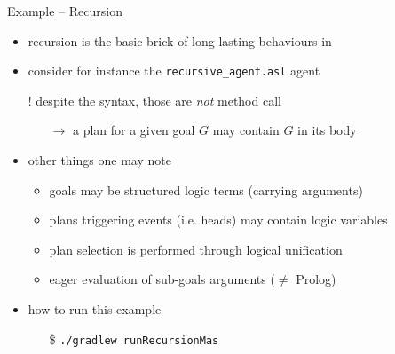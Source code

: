 \documentclass[presentation]{beamer}\mode<presentation>{\usetheme{AMSBolognaFC}}
\begin{document}
\begin{frame}[c, allowframebreaks]{Example \theJasonExample{} -- Recursion}
    \begin{itemize}
        \item recursion is the basic brick of long lasting behaviours in \jason{}
        
        \vspace{.3cm}
        
        \item consider for instance the \texttt{recursive\_agent.asl} agent
        
        
        \vspace{.3cm}
        
        \item[!] despite the syntax, those are \emph{not} method call
        \begin{itemize}
            \item[$\rightarrow$] a plan for a given goal $G$ may contain $G$ in its body
        \end{itemize}
        
        \vspace{.3cm}
        
        \item other things one may note
        \begin{itemize}
            \item goals may be \alert{structured} logic terms (carrying arguments)
            \item plans triggering events (i.e. heads) may contain \alert{logic variables}
            \item plan selection is performed through \alert{logical unification}
            \item \alert{eager evaluation} of sub-goals arguments ($\neq$ Prolog)
        \end{itemize}
        
        \vspace{.3cm}
        
        \item how to run this example
        \begin{itemize}
            \item[\$] \texttt{./gradlew run\alert{Recursion}Mas}
        \end{itemize}
        
    \end{itemize}
\end{frame}
\end{document}
